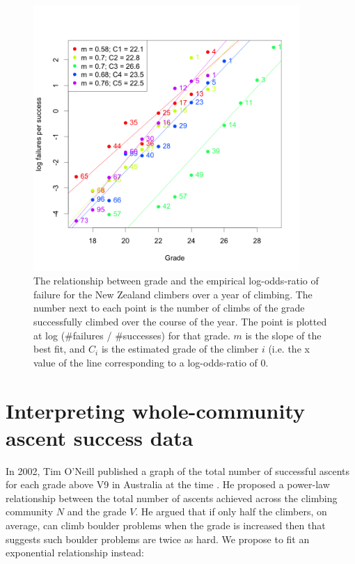 \documentclass[11pt]{article}
\begin{document}
\begin{figure}
\centering
\includegraphics[width=0.9\textwidth]{../results/nz/ascents-from-2016-08-01-to-2021-08-01-minAscents400-minFails1-session-regression.png}
\caption{\small The relationship between grade and the empirical log-odds-ratio of failure for the New Zealand climbers over a year of climbing. The number next to each point is the number of climbs of the grade successfully climbed over the course of the year. The point is plotted at log (\#failures / \#successes) for that grade. $m$ is the slope of the best fit, and $C_i$ is the estimated grade of the climber $i$ (i.e. the x value of the line corresponding to a log-odds-ratio of 0.}
\label{fig2}
\end{figure}


\section{Interpreting whole-community ascent success data}

In 2002, Tim O'Neill published a graph of the total number of successful ascents for each grade above V9 in Australia at the time \cite{oneill2002}. He proposed a power-law relationship between the total number of ascents achieved across the climbing community $N$ and the grade $V$. He argued that if only half the climbers, on average, can climb boulder problems when the grade is increased then that suggests such boulder problems are twice as hard. We propose to fit an exponential relationship instead:
\end{document}
